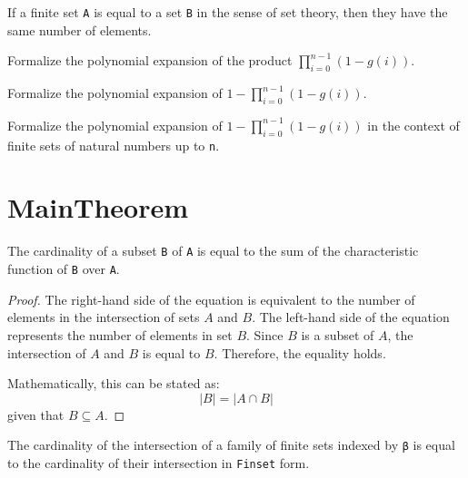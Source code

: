 \begin{lemma}\label{card_eq}
  If a finite set \verb|A| is equal to a set \verb|B| in the sense of set theory, then they have the same number of elements.
\end{lemma}

\begin{lemma}\label{mul_expand₃}
  Formalize the polynomial expansion of the product \(\prod_{i=0}^{n-1} (1 - g(i))\).
\end{lemma}

\begin{lemma}\label{mul_expand₂}
  Formalize the polynomial expansion of \(1 - \prod_{i=0}^{n-1} (1 - g(i))\).
\end{lemma}

\begin{lemma}\label{mul_expand₁}
  Formalize the polynomial expansion of \(1 - \prod_{i=0}^{n-1} (1 - g(i))\) in the context of finite sets of natural numbers up to \verb|n|.
\end{lemma}


\section{MainTheorem}

\begin{lemma}\label{card_eq_sum_char_fun}
  \leanok
  The cardinality of a subset \verb|B| of \verb|A| is equal to the sum of the characteristic function of \verb|B| over \verb|A|.
\end{lemma}

\begin{proof}
  \leanok
  The right-hand side of the equation is equivalent to the number of elements in the intersection of sets $A$ and $B$. The left-hand side of the equation represents the number of elements in set $B$. Since $B$ is a subset of $A$, the intersection of $A$ and $B$ is equal to $B$. Therefore, the equality holds.

  Mathematically, this can be stated as:
  \begin{equation*}
  |B| = |A \cap B|
  \end{equation*}
  given that $B \subseteq A$.
\end{proof}

\begin{lemma}\label{card_eq_FinInter}
  The cardinality of the intersection of a family of finite sets indexed by \verb|β| is equal to the cardinality of their intersection in \verb|Finset| form.
\end{lemma}


